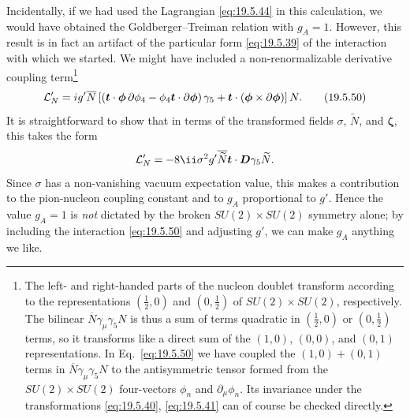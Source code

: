 Incidentally, if we had used the Lagrangian \eqref{eq:19.5.44} in this calculation, we would have obtained the Goldberger--Treiman relation with $g_A=1$. However, this result is in fact an artifact of the particular form \eqref{eq:19.5.39} of the interaction with which we started. We might have included a non-renormalizable derivative coupling term\footnote{The left- and right-handed parts of the nucleon doublet transform according to the representations $(\tfrac12,0)$ and $(0,\tfrac12)$ of $SU(2)\times SU(2)$, respectively. The bilinear $\overline N\gamma_\mu\gamma_5N$ is thus a sum of terms quadratic in $(\tfrac12,0)$ or $(0,\tfrac12)$ terms, so it transforms like a direct sum of the $(1,0)$, $(0,0)$, and $(0,1)$ representations. In Eq.~\eqref{eq:19.5.50} we have coupled the $(1,0)+(0,1)$ terms in $\overline N\gamma_\mu\gamma_5N$ to the antisymmetric tensor formed from the $SU(2)\times SU(2)$ four-vectors $\phi_n$ and $\partial_\mu\phi_n$. Its invariance under the transformations \eqref{eq:19.5.40}, \eqref{eq:19.5.41} can of course be checked directly.}
\begin{equation}
\mathcal L'_N
=ig'\overline N
\left[
\left(
\boldsymbol t\cdot\boldsymbol{\phi}\,
\sl{\partial}\phi_4
-\phi_4\boldsymbol t\cdot
\sl{\partial}\boldsymbol{\phi}
\right)\gamma_5
+\boldsymbol t\cdot
(\boldsymbol{\phi}\times\sl{\partial}\boldsymbol{\phi})
\right]N.
\tag{19.5.50}\label{eq:19.5.50}
\end{equation}
It is straightforward to show that in terms of the transformed fields $\sigma$, $\widetilde N$, and $\boldsymbol{\zeta}$, this takes the form
\[
\mathcal L'_N
=-8\ii\sigma^2g'\overline{\widetilde N}
\boldsymbol t\cdot\sl{\boldsymbol D}\gamma_5\widetilde N.
\]
Since $\sigma$ has a non-vanishing vacuum expectation value, this makes a contribution to the pion-nucleon coupling constant and to $g_A$ proportional to $g'$. Hence the value $g_A=1$ is \emph{not} dictated by the broken $SU(2)\times SU(2)$ symmetry alone; by including the interaction \eqref{eq:19.5.50} and adjusting $g'$, we can make $g_A$ anything we like.

